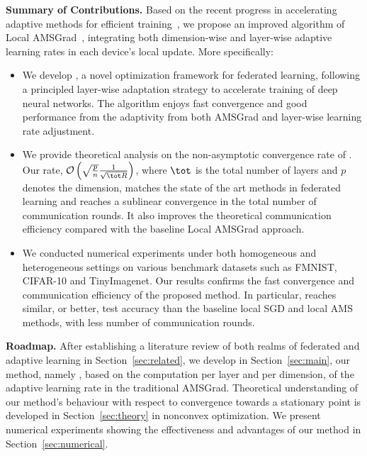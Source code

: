 \documentclass[manuscript,screen,review]{acmart}
\begin{document}
\noindent\textbf{Summary of Contributions.} Based on the recent progress in accelerating adaptive methods for efficient training~\citep{you2019large}, we propose an improved algorithm of Local AMSGrad~\citep{chen2020toward}, integrating both dimension-wise and layer-wise adaptive learning rates in each device's local update.
More specifically:
\begin{itemize}
\item We develop  \algo, a novel optimization framework for federated learning, following a principled layer-wise adaptation strategy to accelerate training of deep neural networks. The algorithm enjoys fast convergence and good performance from the adaptivity from both AMSGrad and layer-wise learning rate adjustment.

\item We provide theoretical analysis on the non-asymptotic convergence rate of \algo. Our rate, $\mathcal{O}\left(\sqrt{\frac{ p}{ n}} \frac{1}{\sqrt{\tot R} } \right)$, where $\tot$ is the total number of layers and $p$ denotes the dimension, matches the state of the art methods in federated learning and reaches a sublinear convergence in the total number of communication rounds. It also improves the theoretical communication efficiency compared with the baseline Local AMSGrad approach.

\item We conducted numerical experiments under both homogeneous and heterogeneous settings on various benchmark datasets such as FMNIST, CIFAR-10 and TinyImagenet. Our results confirms the fast convergence and communication efficiency of the proposed method. In particular, \algo reaches similar, or better, test accuracy than the baseline local SGD and local AMS methods, with less number of communication rounds.
\end{itemize}

\vspace{0.1in}
\noindent\textbf{Roadmap.} After establishing a literature review of both realms of federated and adaptive learning in Section~\ref{sec:related}, we develop in Section~\ref{sec:main}, our method, namely \algo, based on the computation per layer and per dimension, of the adaptive learning rate in the traditional AMSGrad.
Theoretical understanding of our method's behaviour with respect to convergence towards a stationary point is developed in Section~\ref{sec:theory} in nonconvex optimization.
We present numerical experiments showing the effectiveness and advantages of our method in Section~\ref{sec:numerical}.
\end{document}
